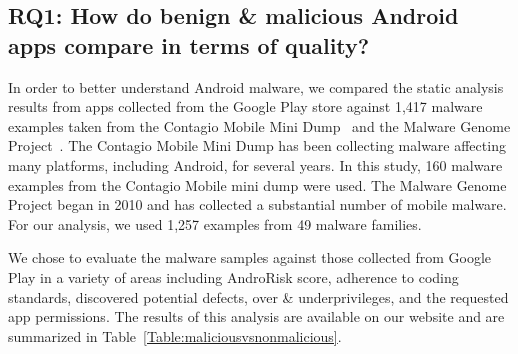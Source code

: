\documentclass{sig-alternate}
\newcommand{\todo}[1]{\textcolor{cyan}{\textbf{[#1]}}}
\begin{document}
\subsection{RQ1: How do benign \& malicious Android apps compare in terms of quality?}

In order to better understand Android malware, we compared the static analysis results from apps collected from the Google Play store against 1,417 malware examples taken from the Contagio Mobile Mini Dump~\cite{contagio_url} and the Malware Genome Project~\cite{Zhou:2012:DAM:2310656.2310710}. The Contagio Mobile Mini Dump has been collecting malware affecting many platforms, including Android, for several years. In this study, 160 malware examples from the Contagio Mobile mini dump were used. The Malware Genome Project began in 2010 and has collected a substantial number of mobile malware. For our analysis, we used 1,257 examples from 49 malware families. %

We chose to evaluate the malware samples against those collected from Google Play in a variety of areas including AndroRisk score, adherence to coding standards, discovered potential defects, over \& underprivileges, and the requested app permissions. The results of this analysis are available on our website and are summarized in Table~\ref{Table:maliciousvsnonmalicious}.

\end{document}
